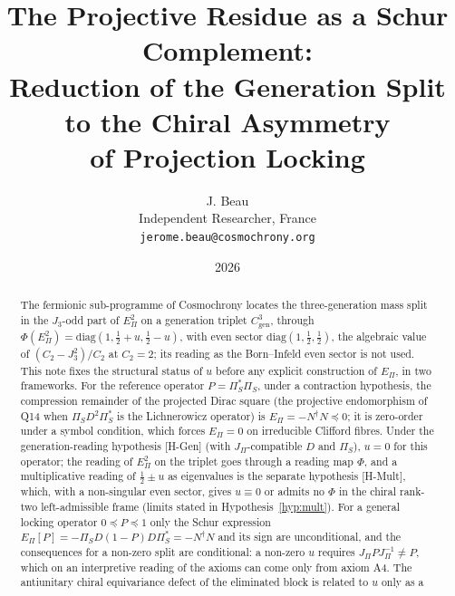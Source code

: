 \documentclass[11pt]{article}
\title{The Projective Residue as a Schur Complement:\\
Reduction of the Generation Split to the Chiral Asymmetry\\
of Projection Locking}
\author{J. Beau\\ Independent Researcher, France\\ \texttt{jerome.beau@cosmochrony.org}}
\date{2026}
\theoremstyle{definition}
\newcommand{\Cgen}{C^3_{\mathrm{gen}}}
\newcommand{\EPi}{E_\Pi}
\newcommand{\PiS}{\Pi_S}
\begin{document}
  \maketitle

  \begin{abstract}
    The fermionic sub-programme of Cosmochrony locates the three-generation mass split in the
      \texorpdfstring{$J_3$}{J₃}-odd part
    of \texorpdfstring{$E_\Pi^2$}{EΠ²} on a generation triplet \texorpdfstring{$\Cgen$}{C³_gen}, through
    \texorpdfstring{$\Phi(E_\Pi^2)=\mathrm{diag}(1,\tfrac12+u,\tfrac12-u)$}{Φ(EΠ²) = diag(1, ½+u, ½−u)},
      with even
    sector \texorpdfstring{$\mathrm{diag}(1,\tfrac12,\tfrac12)$}{diag(1, ½, ½)}, the algebraic value of
    \texorpdfstring{$(C_2-J_3^2)/C_2$}{(C₂−J₃²)/C₂} at \texorpdfstring{$C_2=2$}{C₂ = 2}; its reading as the
      Born--Infeld even sector is not
    used.
    This note fixes the structural status of \texorpdfstring{$u$}{u} before any explicit construction of
      \texorpdfstring{$E_\Pi$}{EΠ}, in two
    frameworks.
    For the reference operator \texorpdfstring{$P=\PiS^{*}\PiS$}{P = Π_S* Π_S}, under a contraction hypothesis, the
    compression remainder of the projected Dirac square (the projective endomorphism of Q14 when
    \texorpdfstring{$\PiS D^2\PiS^{*}$}{Π_S D² Π_S*} is the Lichnerowicz operator) is
    \texorpdfstring{$E_\Pi=-N^{\dagger}N\preceq0$}{EΠ = −N†N ≤ 0}; it is zero-order under a symbol condition,
      which forces
    \texorpdfstring{$E_\Pi=0$}{EΠ = 0} on irreducible Clifford fibres.
    Under the generation-reading hypothesis [H-Gen] (with $J_\Pi$-compatible $D$ and $\PiS$), \texorpdfstring{$u=0$}{u = 0}
    for this operator; the reading of $\EPi^2$ on the triplet goes through a reading map $\Phi$, and a multiplicative
    reading of $\tfrac12\pm u$ as eigenvalues is the separate hypothesis [H-Mult], which, with a non-singular even sector, gives $u\equiv0$ or admits no $\Phi$ in
    the chiral rank-two left-admissible frame (limits stated in Hypothesis~\ref{hyp:mult}).
    For a general locking operator \texorpdfstring{$0\preceq P\preceq1$}{0 ≤ P ≤ 1} only the Schur expression
    \texorpdfstring{$E_\Pi[P]=-\PiS D(1-P)D\PiS^{*}=-N^{\dagger}N$}{EΠ[P] = −Π_S D (1−P) D Π_S* = −N†N} and its
      sign are
    unconditional, and the consequences for a non-zero split are conditional: a non-zero \texorpdfstring{$u$}{u}
      requires
    \texorpdfstring{$J_\Pi PJ_\Pi^{-1}\neq P$}{J_Π P J_Π⁻¹ ≠ P}, which on an interpretive reading of the axioms
      can come only
    from axiom A4.
    The antiunitary chiral equivariance defect of the eliminated block is related to \texorpdfstring{$u$}{u} only as a

\end{abstract}
\end{document}
